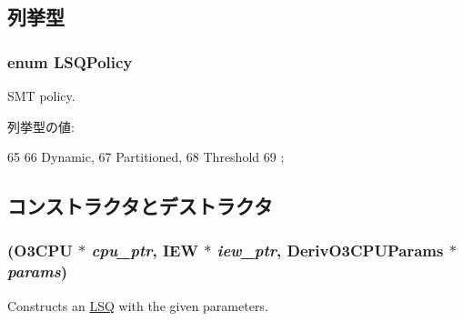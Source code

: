 \subsection{列挙型}
\hypertarget{classLSQ_a2ecb54b28634ef872a820651cce92599}{
\subsubsection[{LSQPolicy}]{\setlength{\rightskip}{0pt plus 5cm}enum {\bf LSQPolicy}}}
\label{classLSQ_a2ecb54b28634ef872a820651cce92599}
SMT policy. \begin{Desc}
\item[列挙型の値: ]\par
\begin{description}
\item[{\em 
\hypertarget{classLSQ_a2ecb54b28634ef872a820651cce92599a96535b1625776102bcc13f7dfb598dcb}{
Dynamic}
\label{classLSQ_a2ecb54b28634ef872a820651cce92599a96535b1625776102bcc13f7dfb598dcb}
}]\item[{\em 
\hypertarget{classLSQ_a2ecb54b28634ef872a820651cce92599add8dfa69b567f90d3f13d819109ab74e}{
Partitioned}
\label{classLSQ_a2ecb54b28634ef872a820651cce92599add8dfa69b567f90d3f13d819109ab74e}
}]\item[{\em 
\hypertarget{classLSQ_a2ecb54b28634ef872a820651cce92599a267544c4de8ecc66bd0fed6310af63be}{
Threshold}
\label{classLSQ_a2ecb54b28634ef872a820651cce92599a267544c4de8ecc66bd0fed6310af63be}
}]\end{description}
\end{Desc}




\begin{DoxyCode}
65                    {
66         Dynamic,
67         Partitioned,
68         Threshold
69     };
\end{DoxyCode}


\subsection{コンストラクタとデストラクタ}
\hypertarget{classLSQ_a268c66c8da0a95e3c0778a5e454ba669}{
\subsubsection[{LSQ}]{ ({\bf O3CPU} $\ast$ {\em cpu\_\-ptr}, \/  {\bf IEW} $\ast$ {\em iew\_\-ptr}, \/  DerivO3CPUParams $\ast$ {\em params})}}
\label{classLSQ_a268c66c8da0a95e3c0778a5e454ba669}
Constructs an \hyperlink{classLSQ}{LSQ} with the given parameters. 


